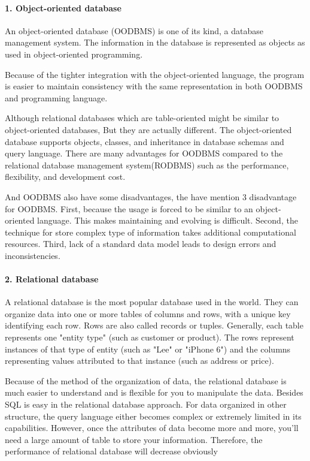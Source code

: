 \paragraph{1. Object-oriented database}
An object-oriented database (OODBMS) is one of its  kind, a  database management     system.\cite{WiKiauthor2013} The information in the database is represented as objects as used in object-oriented programming.

Because of the tighter integration with the object-oriented language, the program is easier to maintain consistency with the same representation in both OODBMS and programming language.

Although relational databases which are table-oriented might be similar to object-oriented databases, But they are actually different. The object-oriented database supports objects, classes, and inheritance in database schemas and query language.
There are many advantages for OODBMS compared to the relational database management system(RODBMS) such as the performance, flexibility, and development cost.

And OODBMS also have some disadvantages, the \cite{Systems2010} have mention 3 disadvantage for OODBMS. First, because the usage is forced to be similar to an object-oriented language. This makes maintaining and evolving is  difficult. Second, the technique for store complex type of information takes additional computational resources. Third, lack of a standard data model leads to design errors and inconsistencies.


\paragraph{2. Relational database}
A relational database is the most popular database used in the world. They can organize data into one or more tables of columns and rows, with a unique key identifying each row. Rows are also called records or tuples. Generally, each table represents one "entity type" (such as customer or product). The rows represent instances of that type of entity (such as "Lee" or "iPhone 6") and the columns representing values attributed to that instance (such as address or price).

Because of the method of the organization of data, the relational database is much easier to understand and is flexible for you to manipulate the data. Besides SQL is easy in the relational database approach. For data organized in other structure, the query language either becomes complex or extremely limited in its capabilities. However, once the attributes of data become more and more, you'll need a large amount of table to store your information. Therefore, the performance of relational database will decrease obviously


